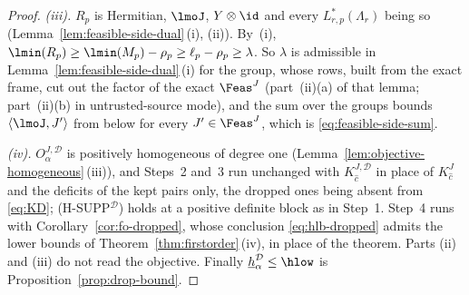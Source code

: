 \begin{proof}
\emph{(iii).} $R_p$ is Hermitian, $\lmoJ$, $Y\otimes\id$ and every
$L^{*}_{r,p}(\Lambda_r)$ being so
(Lemma~\ref{lem:feasible-side-dual}\,(i), (ii)). By
\,(i),
$\lmin(R_p)\ge\lmin(M_p)-\rho_p\ge\ell_p-\rho_p\ge\lambda$. So $\lambda$ is
admissible in Lemma~\ref{lem:feasible-side-dual}\,(i) for the group, whose
rows, built from the exact frame, cut out the factor of the exact
$\Feas^{J}$ (part~(ii)(a) of that lemma; part~(ii)(b) in untrusted-source
mode), and the sum over the groups bounds $\langle\lmoJ,J'\rangle$ from
below for every $J'\in\Feas^{J}$, which is
\eqref{eq:feasible-side-sum}.

\emph{(iv).} $O^{J,\mathcal{D}}_{\alpha}$ is positively homogeneous of degree
one (Lemma~\ref{lem:objective-homogeneous}\,(iii)), and Steps~2 and~3 run
unchanged with $K^{J,\mathcal{D}}_{\hat c}$ in place of $K^{J}_{\hat c}$
and the deficits of the kept pairs only, the dropped ones being absent from
\eqref{eq:KD}; (H-SUPP$^{\mathcal{D}}$) holds at a positive definite block as
in Step~1. Step~4 runs with Corollary~\ref{cor:fo-dropped}, whose
conclusion \eqref{eq:hlb-dropped} admits the lower bounds of
Theorem~\ref{thm:firstorder}\,(iv), in place of the theorem. Parts (ii) and
(iii) do not read the objective. Finally
$\underline{h}^{\mathcal{D}}_{\alpha}\le\hlow$ is
Proposition~\ref{prop:drop-bound}.
\end{proof}
